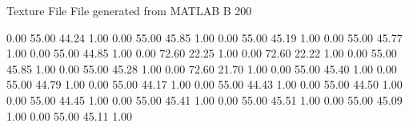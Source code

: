 Texture File
File generated from MATLAB
B 200

0.00   55.00   44.24   1.00
0.00   55.00   45.85   1.00
0.00   55.00   45.19   1.00
0.00   55.00   45.77   1.00
0.00   55.00   44.85   1.00
0.00   72.60   22.25   1.00
0.00   72.60   22.22   1.00
0.00   55.00   45.85   1.00
0.00   55.00   45.28   1.00
0.00   72.60   21.70   1.00
0.00   55.00   45.40   1.00
0.00   55.00   44.79   1.00
0.00   55.00   44.17   1.00
0.00   55.00   44.43   1.00
0.00   55.00   44.50   1.00
0.00   55.00   44.45   1.00
0.00   55.00   45.41   1.00
0.00   55.00   45.51   1.00
0.00   55.00   45.09   1.00
0.00   55.00   45.11   1.00